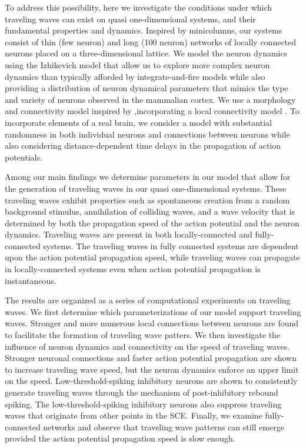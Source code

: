 To address this possibility, here we investigate the conditions under which traveling waves can exist on quasi one-dimensional systems, and their fundamental properties and dynamics.  
Inspired by minicolumns, our systems consist of thin (few neuron) and long (100 neuron) networks of locally connected neurons placed on a three-dimensional lattice.  
We model the neuron dynamics using the Izhikevich model \citep{izhikevich2003} that allow us to explore more complex neuron dynamics than typically afforded by integrate-and-fire models \citep{keane2015}\citep{Senk2020} while also providing a distribution of neuron dynamical parameters that mimics the type and variety of neurons observed in the mammalian cortex.
We use a morphology and connectivity model inspired by \citet{maass2002},incorporating a local connectivity model \citep{Levy2012}\citep{Pyle2017}\citep{Fino2011}.
To incorporate elements of a real brain, we consider a model with substantial randomness in both individual neurons and connections between neurons while also considering  distance-dependent time delays in the propagation of action potentials.

Among our main findings we determine parameters in our model that allow for the generation of traveling waves in our quasi one-dimensional systems. 
These traveling waves exhibit properties such as spontaneous creation from a random background stimulus, annihilation of colliding waves, and a wave velocity that is determined by both the propagation speed of the action potential and the neuron dynamics.
Traveling waves are present in both locally-connected and fully-connected systems. 
The traveling waves in fully connected systems are dependent upon the action potential propagation speed, while traveling waves can propagate in locally-connected systems even when action potential propagation is instantaneous.

The results are organized as a series of computational experiments on traveling waves.
We first determine which parameterizations of our model support traveling waves.
Stronger and more numerous local connections between neurons are found to facilitate the formation of traveling wave patters.
We then investigate the influence of neuron dynamics and connectivity on the speed of traveling waves.
Stronger neuronal connections and faster action potential propagation are shown to increase traveling wave speed, but the neuron dynamics enforce an upper limit on the speed. 
Low-threshold-spiking inhibitory neurons are shown to consistently generate traveling waves through the mechanism of post-inhibitory rebound spiking.
The low-threshold-spiking inhibitory neurons also suppress traveling waves that originate from other points in the SCE.
Finally, we examine fully-connected networks and observe that traveling wave patterns can still emerge provided the action potential propagation speed is slow enough.

